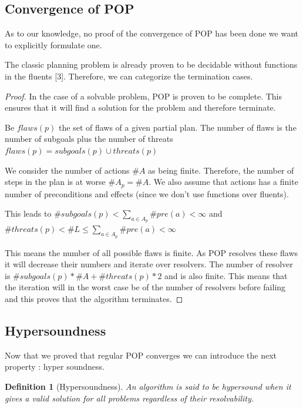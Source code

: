 \documentclass[]{article}
\newtheorem{definition}{Definition}
\begin{document}
\subsection{Convergence of POP}\label{convergence}

As to our knowledge, no proof of the convergence of POP has been done we
want to explicitly formulate one.

The classic planning problem is already proven to be decidable without
functions in the fluents {[}3{]}. Therefore, we can categorize the
termination cases.

\begin{proof}

In the case of a solvable problem, POP is proven to be complete. This
ensures that it will find a solution for the problem and therefore
terminate.

Be \(flaws(p)\) the set of flaws of a given partial plan. The number of
flaws is the number of subgoals plus the number of threats
\(flaws(p) = subgoals(p) \cup threats(p)\)

We consider the number of actions \(\#A\) as being finite. Therefore,
the number of steps in the plan is at worse \(\#A_p = \#A\). We also
assume that actions has a finite number of preconditions and effects
(since we don't use functions over fluents).

This leads to \(\#subgoals(p) < \sum_{a \in A_p} \#pre(a) < \infty\) and
\(\#threats(p) < \#L \le \sum_{a \in A_p} \#pre(a) < \infty\)

This means the number of all possible flaws is finite. As POP resolves
these flaws it will decrease their numbers and iterate over resolvers.
The number of resolver is \(\#subgoals(p) * \#A + \#threats(p) * 2\) and
is also finite. This means that the iteration will in the worst case be
of the number of resolvers before failing and this proves that the
algorithm terminates. \qedhere

\end{proof}

\subsection{Hypersoundness}\label{hypersoundeness}

Now that we proved that regular POP converges we can introduce the next
property : hyper soundness.

\begin{definition}[Hypersoundness]

An algorithm is said to be hypersound when it gives a valid solution for
all problems regardless of their resolvability.

\end{definition}
\end{document}
